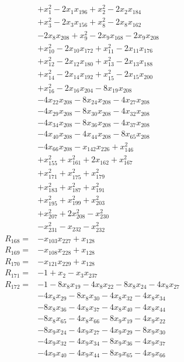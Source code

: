 \begin{align*}
&+x_{1}^{2} -2x_{1}x_{196} +x_{2}^{2} -2x_{2}x_{184}\\
&+x_{3}^{2} -2x_{3}x_{156} +x_{8}^{2} -2x_{8}x_{162}\\
&-2x_{8}x_{208} +x_{9}^{2} -2x_{9}x_{168} -2x_{9}x_{208}\\
&+x_{10}^{2} -2x_{10}x_{172} +x_{11}^{2} -2x_{11}x_{176}\\
&+x_{12}^{2} -2x_{12}x_{180} +x_{13}^{2} -2x_{13}x_{188}\\
&+x_{14}^{2} -2x_{14}x_{192} +x_{15}^{2} -2x_{15}x_{200}\\
&+x_{16}^{2} -2x_{16}x_{204} -8x_{19}x_{208}\\
&-4x_{22}x_{208} -8x_{24}x_{208} -4x_{27}x_{208}\\
&-4x_{29}x_{208} -8x_{30}x_{208} -4x_{32}x_{208}\\
&-4x_{34}x_{208} -8x_{36}x_{208} -4x_{37}x_{208}\\
&-4x_{40}x_{208} -4x_{44}x_{208} -8x_{65}x_{208}\\
&-4x_{66}x_{208} -x_{142}x_{226} +x_{146}^{2}\\
&+x_{155}^{2} +x_{161}^{2} +2x_{162} +x_{167}^{2}\\
&+x_{171}^{2} +x_{175}^{2} +x_{179}^{2}\\
&+x_{183}^{2} +x_{187}^{2} +x_{191}^{2}\\
&+x_{195}^{2} +x_{199}^{2} +x_{203}^{2}\\
&+x_{207}^{2} +2x_{208}^{2} -x_{230}^{2}\\
&-x_{231}^{2} -x_{232} -x_{232}^{2}\\[3pt]
R_{168}={}&-x_{103}x_{227} +x_{128}\\[3pt]
R_{169}={}&-x_{108}x_{228} +x_{128}\\[3pt]
R_{170}={}&-x_{121}x_{229} +x_{128}\\[3pt]
R_{171}={}&-1 +x_{2} -x_{3}x_{237}\\[3pt]
R_{172}={}&-1 -8x_{8}x_{19} -4x_{8}x_{22} -8x_{8}x_{24} -4x_{8}x_{27}\\
&-4x_{8}x_{29} -8x_{8}x_{30} -4x_{8}x_{32} -4x_{8}x_{34}\\
&-8x_{8}x_{36} -4x_{8}x_{37} -4x_{8}x_{40} -4x_{8}x_{44}\\
&-8x_{8}x_{65} -4x_{8}x_{66} -8x_{9}x_{19} -4x_{9}x_{22}\\
&-8x_{9}x_{24} -4x_{9}x_{27} -4x_{9}x_{29} -8x_{9}x_{30}\\
&-4x_{9}x_{32} -4x_{9}x_{34} -8x_{9}x_{36} -4x_{9}x_{37}\\
&-4x_{9}x_{40} -4x_{9}x_{44} -8x_{9}x_{65} -4x_{9}x_{66}\\

\end{align*}
